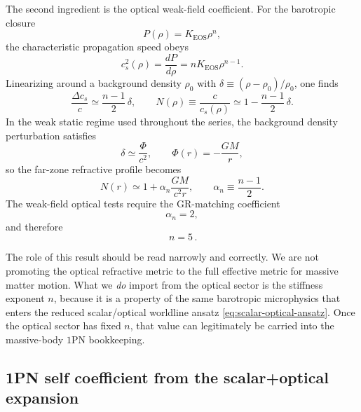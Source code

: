 \documentclass[11pt]{article}
\newcommand{\KEOS}{K_{\mathrm{EOS}}}
\newcommand{\PhiN}{\Phi}
\begin{document}
The second ingredient is the optical weak-field coefficient. For the barotropic closure
\begin{equation}
P(\rho)=\KEOS \rho^n,
\label{eq:eos-self-section}
\end{equation}
the characteristic propagation speed obeys
\begin{equation}
c_s^2(\rho)=\frac{dP}{d\rho}=n\KEOS \rho^{n-1}.
\label{eq:sound-speed-self-section}
\end{equation}
Linearizing around a background density \(\rho_0\) with
\(\delta \equiv (\rho-\rho_0)/\rho_0\), one finds
\begin{equation}
\frac{\Delta c_s}{c}
\simeq
\frac{n-1}{2}\,\delta,
\qquad
N(\rho)\equiv \frac{c}{c_s(\rho)}
\simeq
1-\frac{n-1}{2}\,\delta.
\label{eq:index-linearized}
\end{equation}
In the weak static regime used throughout the series, the background density perturbation
satisfies
\begin{equation}
\delta \simeq \frac{\PhiN}{c^2},
\qquad
\PhiN(r)=-\frac{GM}{r},
\label{eq:delta-from-potential}
\end{equation}
so the far-zone refractive profile becomes
\begin{equation}
N(r)
\simeq
1+\alpha_n\frac{GM}{c^2 r},
\qquad
\alpha_n\equiv \frac{n-1}{2}.
\label{eq:alpha-n-def}
\end{equation}
The weak-field optical tests require the GR-matching coefficient
\begin{equation}
\alpha_n = 2,
\label{eq:alpha-n-two}
\end{equation}
and therefore
\begin{equation}
\boxed{\,n=5\,}.
\label{eq:n-equals-five}
\end{equation}

The role of this result should be read narrowly and correctly. We are not promoting the
optical refractive metric to the full effective metric for massive matter motion. What we
\emph{do} import from the optical sector is the stiffness exponent \(n\), because it is a
property of the same barotropic microphysics that enters the reduced scalar/optical
worldline ansatz \eqref{eq:scalar-optical-ansatz}. Once the optical sector has fixed
\(n\), that value can legitimately be carried into the massive-body \(1\)PN bookkeeping.

\subsection{1PN self coefficient from the scalar+optical expansion}
\label{sec:self-coeff}
\end{document}
